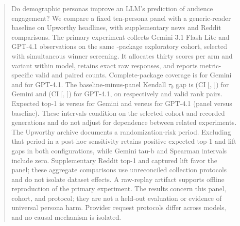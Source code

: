 \begin{abstract}
Do demographic personas improve an LLM's prediction of audience engagement? We compare a fixed
ten-persona panel with a generic-reader baseline on Upworthy headlines, with supplementary
news and Reddit comparisons. The primary experiment collects Gemini 3.1 Flash-Lite and GPT-4.1
observations on the same \newSelectedN{}-package exploratory cohort, selected with simultaneous
winner screening. It allocates thirty scores per arm and variant within model, retains exact raw
responses, and reports metric-specific valid and paired counts. Complete-package coverage is
\newGeminiN{} for Gemini and \newGptN{} for GPT-4.1. The baseline-minus-panel Kendall $\tau_b$ gap is
\newGeminiGapTau{} (CI [\newGeminiGapTauLow{}, \newGeminiGapTauHigh{}]) for Gemini and
\newGptGapTau{} (CI [\newGptGapTauLow{}, \newGptGapTauHigh{}]) for GPT-4.1, on respectively
\newGeminiPairedTauN{} and \newGptPairedTauN{} valid rank pairs. Expected top-1 is
\newGeminiPanelTopOne{} versus \newGeminiBaselineTopOne{} for Gemini and \newGptPanelTopOne{}
versus \newGptBaselineTopOne{} for GPT-4.1 (panel versus baseline). These intervals condition on
the selected cohort and recorded generations and do not adjust for dependence between related experiments. The Upworthy archive documents a randomization-risk
period. Excluding that period in a post-hoc sensitivity retains positive expected top-1 and lift
gaps in both configurations, while Gemini tau-b and Spearman intervals include zero. Supplementary
Reddit top-1 and captured lift favor the panel; these aggregate comparisons use unreconciled
collection protocols and do not isolate dataset effects. A raw-replay artifact supports offline reproduction of the primary experiment.
The results concern this panel, cohort, and protocol; they are not a held-out evaluation or
evidence of universal persona harm. Provider request protocols differ across models, and no
causal mechanism is isolated.
\end{abstract}
